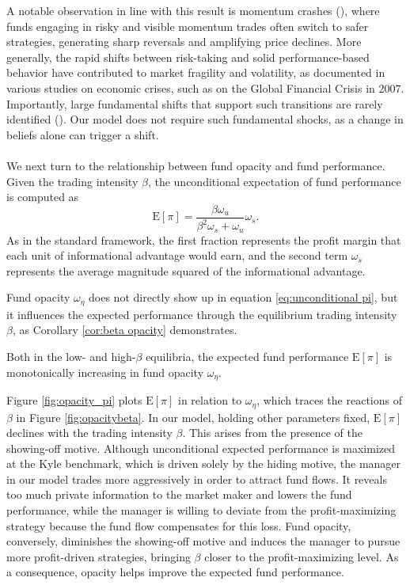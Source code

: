 A notable observation in line with this result is momentum crashes (\citealp{daniel2016momentum}), where funds engaging in risky and visible momentum trades often switch to safer strategies, generating sharp reversals and amplifying price declines. More generally, the rapid shifts between risk-taking and solid performance-based behavior have contributed to market fragility and volatility, as documented in various studies on economic crises, such as \citet{brunnermeier2009deciphering} on the Global Financial Crisis in 2007. Importantly, large fundamental shifts that support such transitions are rarely identified (\citealp{gennotte1999market}). Our model does not require such fundamental shocks, as a change in beliefs alone can trigger a shift.

\paragraph{}
We next turn to the relationship between fund opacity and fund performance. Given the trading intensity $\beta$, the unconditional expectation of fund performance is computed as
\begin{equation}
     \mathrm{E}[\pi] = \frac{\beta \omega_{u}}{\beta^2 \omega_{s} + \omega_{u}}\omega_{s}.\label{eq:unconditional pi}
\end{equation}
As in the standard \citet{kyle1985continuous} framework, the first fraction represents the profit margin that each unit of informational advantage would earn, and the second term $\omega_s$ represents the average magnitude squared of the informational advantage.

Fund opacity $\omega_{\eta}$ does not directly show up in equation \eqref{eq:unconditional pi}, but it influences the expected performance through the equilibrium trading intensity $\beta$, as Corollary \ref{cor:beta opacity} demonstrates.
\begin{corollary}\label{cor:opacity_performance}
     Both in the low- and high-$\beta$ equilibria, the expected fund performance $\mathrm{E}[\pi]$ is monotonically increasing in fund opacity $\omega_{\eta}$.
 \end{corollary}
 
 Figure \ref{fig:opacity_pi} plots $\mathrm{E}[\pi]$ in relation to  $\omega_{\eta}$, which traces the reactions of $\beta$ in Figure \ref{fig:opacitybeta}. In our model, holding other parameters fixed, $\mathrm{E}[\pi]$ declines with the trading intensity $\beta$. This arises from the presence of the showing-off motive. Although unconditional expected performance is maximized at the Kyle benchmark, which is driven solely by the hiding motive, the manager in our model trades more aggressively in order to attract fund flows. It reveals too much private information to the market maker and lowers the fund performance, while the manager is willing to deviate from the profit-maximizing strategy because the fund flow compensates for this loss. Fund opacity, conversely, diminishes the showing-off motive and induces the manager to pursue more profit-driven strategies, bringing $\beta$ closer to the profit-maximizing level. As a consequence, opacity helps improve the expected fund performance.

